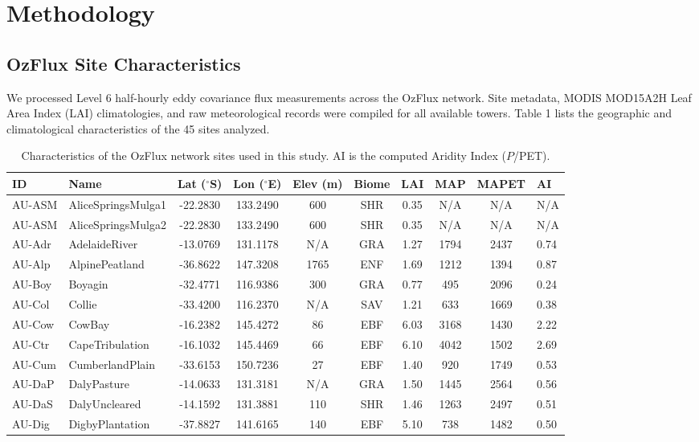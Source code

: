 \documentclass[11pt,a4paper]{article}
\begin{document}
\section{Methodology}
\subsection{OzFlux Site Characteristics}
We processed Level 6 half-hourly eddy covariance flux measurements across the OzFlux network. Site metadata, MODIS MOD15A2H Leaf Area Index (LAI) climatologies, and raw meteorological records were compiled for all available towers. Table 1 lists the geographic and climatological characteristics of the 45 sites analyzed.

\begin{longtable}{llccccccc}
\caption{Characteristics of the OzFlux network sites used in this study. AI is the computed Aridity Index ($P$/PET).}\\
\toprule
ID & Name & Lat ($^\circ$S) & Lon ($^\circ$E) & Elev (m) & Biome & LAI & MAP & MAPET & AI \\
\midrule
\endhead
\bottomrule
\endfoot
AU-ASM & AliceSpringsMulga1 & -22.2830 & 133.2490 & 600 & SHR & 0.35 & N/A & N/A & N/A \\
AU-ASM & AliceSpringsMulga2 & -22.2830 & 133.2490 & 600 & SHR & 0.35 & N/A & N/A & N/A \\
AU-Adr & AdelaideRiver & -13.0769 & 131.1178 & N/A & GRA & 1.27 & 1794 & 2437 & 0.74 \\
AU-Alp & AlpinePeatland & -36.8622 & 147.3208 & 1765 & ENF & 1.69 & 1212 & 1394 & 0.87 \\
AU-Boy & Boyagin & -32.4771 & 116.9386 & 300 & GRA & 0.77 & 495 & 2096 & 0.24 \\
AU-Col & Collie & -33.4200 & 116.2370 & N/A & SAV & 1.21 & 633 & 1669 & 0.38 \\
AU-Cow & CowBay & -16.2382 & 145.4272 & 86 & EBF & 6.03 & 3168 & 1430 & 2.22 \\
AU-Ctr & CapeTribulation & -16.1032 & 145.4469 & 66 & EBF & 6.10 & 4042 & 1502 & 2.69 \\
AU-Cum & CumberlandPlain & -33.6153 & 150.7236 & 27 & EBF & 1.40 & 920 & 1749 & 0.53 \\
AU-DaP & DalyPasture & -14.0633 & 131.3181 & N/A & GRA & 1.50 & 1445 & 2564 & 0.56 \\
AU-DaS & DalyUncleared & -14.1592 & 131.3881 & 110 & SHR & 1.46 & 1263 & 2497 & 0.51 \\
AU-Dig & DigbyPlantation & -37.8827 & 141.6165 & 140 & EBF & 5.10 & 738 & 1482 & 0.50 \\

\end{longtable}
\end{document}
